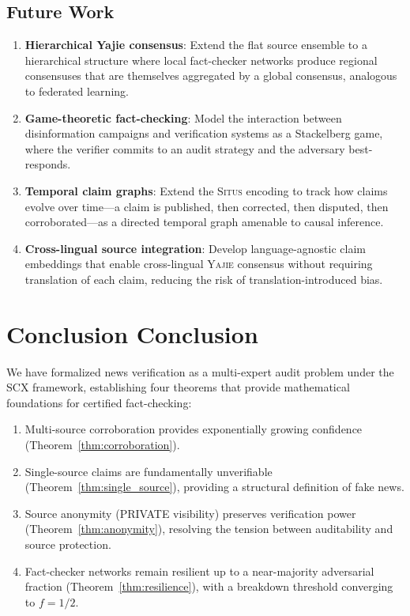 \documentclass[11pt,a4paper]{article}
\theoremstyle{definition}
\newcommand{\Situs}{\textsc{Situs}}
\newcommand{\Yajie}{\textsc{Yajie}}
\newcommand{\SCX}{\textsc{SCX}}
\newcommand{\VISprivate}{\textsc{PRIVATE}}
\begin{document}
\subsection{Future Work }

\begin{enumerate}[label=(\roman*)]
    \item \textbf{Hierarchical Yajie consensus}: Extend the flat source ensemble to a hierarchical structure where local fact-checker networks produce regional consensuses that are themselves aggregated by a global consensus, analogous to federated learning.
    \item \textbf{Game-theoretic fact-checking}: Model the interaction between disinformation campaigns and verification systems as a Stackelberg game, where the verifier commits to an audit strategy and the adversary best-responds.
    \item \textbf{Temporal claim graphs}: Extend the \Situs{} encoding to track how claims evolve over time---a claim is published, then corrected, then disputed, then corroborated---as a directed temporal graph amenable to causal inference.
    \item \textbf{Cross-lingual source integration}: Develop language-agnostic claim embeddings that enable cross-lingual \Yajie{} consensus without requiring translation of each claim, reducing the risk of translation-introduced bias.
\end{enumerate}

\section{Conclusion Conclusion}

We have formalized news verification as a multi-expert audit problem under the \SCX{} framework, establishing four theorems that provide mathematical foundations for certified fact-checking:

\begin{enumerate}[label=(\roman*)]
    \item Multi-source corroboration provides exponentially growing confidence (Theorem~\ref{thm:corroboration}).
    \item Single-source claims are fundamentally unverifiable (Theorem~\ref{thm:single_source}), providing a structural definition of fake news.
    \item Source anonymity (\VISprivate{} visibility) preserves verification power (Theorem~\ref{thm:anonymity}), resolving the tension between auditability and source protection.
    \item Fact-checker networks remain resilient up to a near-majority adversarial fraction (Theorem~\ref{thm:resilience}), with a breakdown threshold converging to $f = 1/2$.
\end{enumerate}
\end{document}
